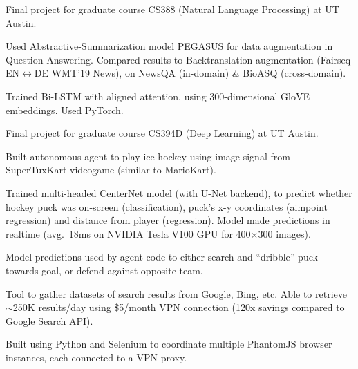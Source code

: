 \documentclass[]{deedy-resume-openfont}
\begin{document}


\subsubsectionsep
Final project for graduate course CS388 (Natural Language Processing) at UT Austin.
\begin{tightemize}
    \item Used Abstractive-Summarization model PEGASUS for data augmentation in Question-Answering. Compared results to Backtranslation augmentation (Fairseq EN$\leftrightarrow$DE WMT'19 News), on NewsQA (in-domain) \& BioASQ (cross-domain).
    \item Trained Bi-LSTM with aligned attention, using 300-dimensional GloVE embeddings. Used PyTorch.
\end{tightemize}
\sectionsep

Final project for graduate course CS394D (Deep Learning) at UT Austin.
\begin{tightemize}
    \item Built autonomous agent to play ice-hockey using image signal from SuperTuxKart videogame (similar to MarioKart). 
    \item Trained multi-headed CenterNet model (with U-Net backend), to predict whether hockey puck was on-screen (classification), puck's x-y coordinates (aimpoint regression) and distance from player (regression). Model made predictions in realtime \mbox{(avg. 18ms} on NVIDIA Tesla V100 GPU for 400$\times$300 images).
    \item Model predictions used by agent-code to either search and ``dribble'' puck towards goal, or defend against opposite team.
\end{tightemize}
\sectionsep


\begin{tightemize}
    \item Tool to gather datasets of search results from Google, Bing, etc. Able to retrieve $\sim$250K results/day using \$5/month VPN connection (120x savings compared to Google Search API).
    \item Built using Python and Selenium to coordinate multiple PhantomJS browser instances, each connected to a VPN proxy.
\end{tightemize}
\end{document}
